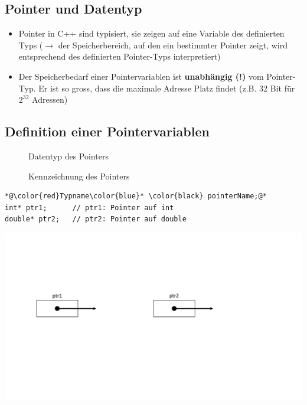 \subsection{Pointer und Datentyp}
\begin{itemize}
	\item Pointer in C++ sind typisiert, sie zeigen auf eine Variable des definierten Typs ($\rightarrow$ der Speicherbereich, auf den ein bestimmter Pointer zeigt, wird entsprechend des definierten Pointer-Typs interpretiert) 
	\item Der Speicherbedarf einer Pointervariablen ist \textbf{unabhängig (!)} vom Pointer-Typ. Er ist so gross, dass die maximale Adresse Platz findet (z.B. 32 Bit für $2^{32}$ Adressen)
\end{itemize}

\subsection{Definition einer Pointervariablen}
\begin{description}
	\item[\color{red}{Typname}] Datentyp des Pointers
	\item[\color{blue}{*}] Kennzeichnung des Pointers
\end{description}
\begin{minipage}{0.5\linewidth}
\vspace{-\baselineskip}
\begin{lstlisting}
*@\color{red}Typname\color{blue}* \color{black} pointerName;@*
int* ptr1;		// ptr1: Pointer auf int
double* ptr2;	// ptr2: Pointer auf double
\end{lstlisting}
\end{minipage}
\hspace{0.01\linewidth}
\begin{minipage}{0.45\linewidth}
	\includegraphics[width=\linewidth]{images/pointer2.pdf}
\end{minipage}

